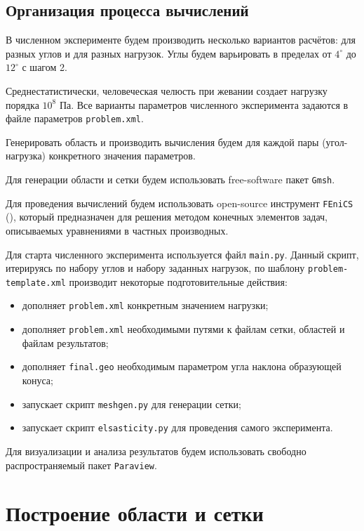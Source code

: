 \documentclass[a4paper, 14pt]{extreport}
\begin{document}
\subsection{Организация процесса вычислений}

В численном эксперименте будем производить несколько 
вариантов расчётов: для разных углов и для разных нагрузок. 
Углы будем варьировать в пределах от 
$4^{\circ}$ до $12^{\circ}$  с 
шагом 2. 

Среднестатистически, человеческая челюсть при жевании 
создает нагрузку порядка $10^8$ Па. 
Все варианты параметров численного эксперимента задаются в 
файле параметров \texttt{problem.xml}.

Генерировать область  и производить вычисления будем для 
каждой пары (угол-нагрузка) конкретного значения параметров.

Для генерации области и сетки будем использовать 
free-software пакет \texttt{Gmsh}.

Для проведения вычислений будем использовать open-source
инструмент \texttt{FEniCS} (\cite{fenics_book}), который 
предназначен  для решения методом конечных элементов  
задач, описываемых  уравнениями в частных производных. 

Для старта численного эксперимента используется файл \texttt{main.py}.
Данный скрипт, итерируясь по набору углов и набору заданных 
нагрузок, по шаблону \texttt{problem-template.xml} 
производит некоторые подготовительные действия:

\begin{itemize}
\item дополняет \texttt{problem.xml} конкретным значением нагрузки;
\item дополняет \texttt{problem.xml} необходимыми путями к файлам сетки, 
областей и файлам результатов;
\item дополняет \texttt{final.geo} необходимым параметром угла наклона
 образующей конуса;
\item запускает скрипт \texttt{meshgen.py} для генерации сетки;
\item запускает скрипт \texttt{elsasticity.py} для проведения самого 
эксперимента.
\end{itemize}

Для визуализации и анализа результатов будем использовать
свободно распространяемый  пакет \texttt{Paraview}.

\section{Построение области и сетки}
\end{document}
